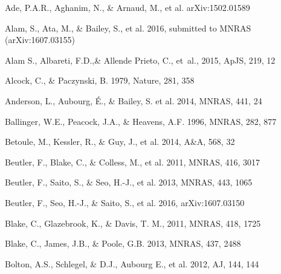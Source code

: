 \documentclass[prl,twocolumn,superscriptaddress,aps,amsmath,amssymb,nofootinbib,altaffilletter]{revtex4}
\begin{document}
\begin{thebibliography}{}

Ade, P.A.R., Aghanim, N., \& Arnaud, M., et al. arXiv:1502.01589

Alam, S., Ata, M., \& Bailey, S., et al. 2016,
submitted to MNRAS (arXiv:1607.03155)

{Alam} S., Albareti, F.D.,\& Allende Prieto, C., {et~al.}, 2015,  ApJS, 219, 12

Alcock, C., \& Paczynski, B. 1979, Nature, 281, 358  


Anderson, L., Aubourg, \'E., \& Bailey, S. et al. 2014, MNRAS, 441, 24  
  

Ballinger, W.E., Peacock, J.A., \& Heavens, A.F. 1996, MNRAS, 282, 877  

Betoule, M., Kessler, R., \& Guy, J., et al. 2014, A\&A, 568, 32


Beutler, F., Blake, C., \& Colless, M., et al. 2011, MNRAS, 416, 3017

Beutler, F., Saito, S., \& Seo, H.-J., et al. 2013, MNRAS, 443, 1065

Beutler, F., Seo, H.-J., \& Saito, S., et al. 2016,
arXiv:1607.03150

Blake, C., Glazebrook, K., \& Davis, T. M., 2011, MNRAS, 418, 1725  

Blake, C., James, J.B., \& Poole, G.B. 2013, MNRAS, 437, 2488

Bolton, A.S., Schlegel, \& D.J., Aubourg E., et al. 2012, AJ, 144, 144


\end{thebibliography}
\end{document}
